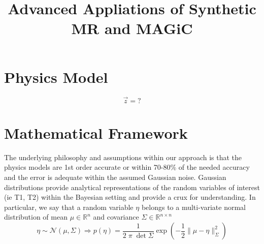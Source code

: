 \documentclass{article}         %
\title{Advanced Appliations of Synthetic MR and MAGiC}
\author{}
\theoremstyle{definition}
\theoremstyle{remark}
\begin{document}
\maketitle


\section{Physics Model}\label{PhysicsModel}

\[
  \vec{z}  =  ?
\]

\section{Mathematical Framework}\label{GeneralMathFramework}

The underlying philosophy and assumptions within our approach is that the physics 
models are 1st order accurate or within 70-80\% of the needed accuracy and the error is
adequate within the assumed Gaussian noise.
Gaussian distributions provide analytical representations of the random
variables of interest (ie T1, T2) within the Bayesian setting and 
provide a crux for understanding. In particular, we say that a random
variable $\eta$ belongs to a multi-variate normal distribution 
of mean $\mu \in \mathbb{R}^n $ and covariance $\Sigma \in \mathbb{R}^{n \times n}$
\[
     \eta \sim \mathcal{N}(\mu,\Sigma)  
    \Rightarrow
      p(\eta)  = \frac{1}{2 \; \pi \; \det{\Sigma}} \exp\left( - \frac{1}{2} \| \mu - \eta\|^2_{\Sigma}\right)
\]
\end{document}
